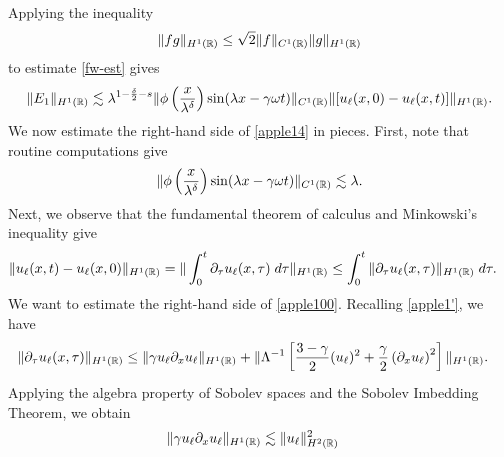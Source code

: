 %
%
Applying the inequality 
%
%
\begin{equation*}
\label{applec}
\|fg\|_{H^1(\mathbb{R})} \le \sqrt{2} \|f\|_{C^1(\mathbb{R})} \|g\|_{H^1(\mathbb{R})}
\end{equation*}
%
%
%
%
%
%
%
%
to estimate \eqref{fw-est} gives
%
%
\begin{equation}
\begin{split}
\|E_1\|_{H^1(\mathbb{R})} \lesssim \lambda^{1 - \frac{\delta}{2} -s } \|\phi
\left( \frac{x}{\lambda^\delta} \right) \sin (\lambda x - \gamma \omega t)
\|_{C^1(\mathbb{R})} \|[u_\ell (x,0) - u_\ell (x,t) ] \|_{H^1(\mathbb{R})}.
\label{apple14}
\end{split}
\end{equation}
%
%
We now estimate the right-hand side of \eqref{apple14} in pieces. First, 
note that routine computations give
%
%
\begin{equation}
\begin{split}
\|\phi\left( \frac{x}{\lambda^\delta} \right) \sin(\lambda x - \gamma 
\omega t)
\|_{C^1(\mathbb{R})}
\lesssim \lambda.
\label{apple15}
\end{split}
\end{equation}
%
%
Next, we observe that the fundamental 
theorem
of calculus and Minkowski's inequality give
%
%
%
%
\begin{equation}
\begin{split}
\|u_\ell(x,t) - u_\ell(x,0)\|_{H^1(\mathbb{R})}
& =  \| \int_0^t \partial_\tau
u_\ell(x,\tau) \; d \tau \|_{H^1(\mathbb{R})}
\le \int_0^t \|\partial_\tau u_\ell (x,\tau) \|_{H^1(\mathbb{R})} \; d \tau.
\label{apple100}
\end{split}
\end{equation}
%
%
We want to estimate the right-hand side of \eqref{apple100}. Recalling
\eqref{apple1'}, we have
%
%
\begin{equation}
\label{apple101}
\begin{split}
\|\partial_\tau u_\ell(x,\tau) \|_{H^1(\mathbb{R})}
& \le \|\gamma u_\ell \partial_x u_\ell \|_{H^1(\mathbb{R})}
+ \|\Lambda^{-1} \left[
\frac{3-\gamma}{2} (u_\ell)^2 + \frac{\gamma}{2} \left( \partial_x u_\ell 
\right)^2
\right] \|_{H^1(\mathbb{R})}.
\end{split}
\end{equation}
%
%
Applying the algebra property of Sobolev spaces and the Sobolev Imbedding 
Theorem, we obtain
%
%
\begin{equation*}
\begin{split}
\|\gamma u_\ell \partial_x u_\ell \|_{H^1(\mathbb{R})} &
\lesssim \|u_\ell\|_{H^2(\mathbb{R})}^2
\end{split}
\end{equation*}
